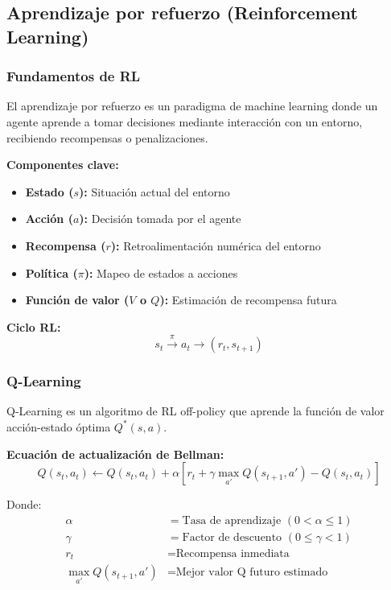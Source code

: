 \documentclass[12pt,a4paper]{article}
\begin{document}
\subsection{Aprendizaje por refuerzo (Reinforcement Learning)}

\subsubsection{Fundamentos de RL}

El aprendizaje por refuerzo es un paradigma de machine learning donde un agente aprende a tomar decisiones mediante interacción con un entorno, recibiendo recompensas o penalizaciones.

\textbf{Componentes clave:}
\begin{itemize}
    \item \textbf{Estado ($s$):} Situación actual del entorno
    \item \textbf{Acción ($a$):} Decisión tomada por el agente
    \item \textbf{Recompensa ($r$):} Retroalimentación numérica del entorno
    \item \textbf{Política ($\pi$):} Mapeo de estados a acciones
    \item \textbf{Función de valor ($V$ o $Q$):} Estimación de recompensa futura
\end{itemize}

\textbf{Ciclo RL:}
\begin{equation}
    s_t \xrightarrow{\pi} a_t \xrightarrow{} (r_t, s_{t+1})
\end{equation}

\subsubsection{Q-Learning}

Q-Learning es un algoritmo de RL off-policy que aprende la función de valor acción-estado óptima $Q^*(s, a)$.

\textbf{Ecuación de actualización de Bellman:}
\begin{equation}
    Q(s_t, a_t) \leftarrow Q(s_t, a_t) + \alpha \left[ r_t + \gamma \max_{a'} Q(s_{t+1}, a') - Q(s_t, a_t) \right]
\end{equation}

Donde:
\begin{align}
    \alpha &= \text{Tasa de aprendizaje } (0 < \alpha \leq 1) \\
    \gamma &= \text{Factor de descuento } (0 \leq \gamma < 1) \\
    r_t &= \text{Recompensa inmediata} \\
    \max_{a'} Q(s_{t+1}, a') &= \text{Mejor valor Q futuro estimado}
\end{align}
\end{document}

